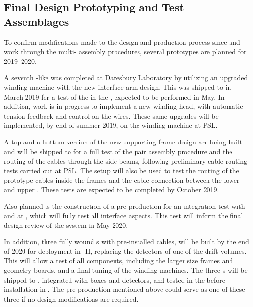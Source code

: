 


\subsection{Final Design Prototyping and Test Assemblages}
\label{sec:fdsp-apa-qa-prototyping}

To confirm modifications made to the  design and production process since  and work through the multi- assembly procedures, several prototypes are planned for 2019--2020.

A seventh -like  was completed at Daresbury Laboratory by utilizing an upgraded winding machine with the new interface arm design. This  was shipped to  in March 2019 for a test of the  in the \coldbox, expected to be performed in May. In addition, work is in progress to implement a new winding head, with automatic tension feedback and control on the wires. These same upgrades will be implemented, by end of summer 2019, on the winding machine at PSL. %

A top and a bottom version of the new supporting  frame design are being built and will be shipped to  for a full test of the  pair %
assembly procedure and the routing of the  cables through the  side beams, following preliminary cable routing tests carried out at PSL. The  setup will also be used to test the routing of the  prototype cables inside the  frames and the cable connection between the lower and upper .  These tests are expected to be completed by October 2019.

Also planned is the construction of a pre-production  for an integration test with  and  at , which will fully test all interface aspects. This test will inform the final design review of the  system in May 2020. 

In addition, three fully wound s with pre-installed  cables, will be built by the end of 2020 for deployment in -II, replacing the detectors of one of the drift volumes.  This will allow a test of all  components, including the larger size frames and geometry boards, and a final tuning of the winding machines. The three s will be shipped to , integrated with  boxes and  detectors, and tested in the \coldbox before installation in .  The pre-production  mentioned above could serve as one of these three if no design modifications are required. 

